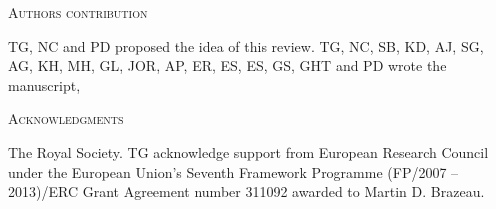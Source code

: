 \documentclass[12pt,letterpaper]{article}
\renewcommand{\section}[1]{%
\bigskip
\begin{center}
\begin{Large}
\normalfont\scshape #1
\medskip
\end{Large}
\end{center}}
\begin{document}












\section{Authors contribution}
TG, NC and PD proposed the idea of this review. TG, NC, SB, KD, AJ, SG, AG, KH, MH, GL, JOR, AP, ER, ES, ES, GS, GHT and PD wrote the manuscript,

\section{Acknowledgments}
The Royal Society.
TG acknowledge support from European Research Council under the European Union's Seventh Framework Programme (FP/2007 – 2013)/ERC Grant Agreement number 311092 awarded to Martin D. Brazeau.




\end{document}
